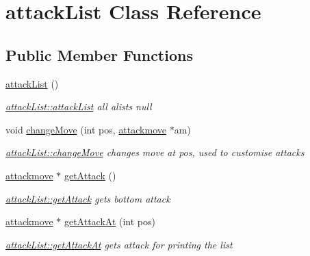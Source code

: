 \hypertarget{classattack_list}{\section{attack\-List Class Reference}
\label{classattack_list}
}
\subsection*{Public Member Functions}
\begin{DoxyCompactItemize}
\item 
\hypertarget{classattack_list_a5edfbea9eb0790b0b2f4bb8a3f39f843}{\hyperlink{classattack_list_a5edfbea9eb0790b0b2f4bb8a3f39f843}{attack\-List} ()}\label{classattack_list_a5edfbea9eb0790b0b2f4bb8a3f39f843}

\begin{DoxyCompactList}\small\item\em \hyperlink{classattack_list_a5edfbea9eb0790b0b2f4bb8a3f39f843}{attack\-List\-::attack\-List} all alists null \end{DoxyCompactList}\item 
void \hyperlink{classattack_list_a8bf01a96841205373a2b179c251f6388}{change\-Move} (int pos, \hyperlink{classattackmove}{attackmove} $\ast$am)
\begin{DoxyCompactList}\small\item\em \hyperlink{classattack_list_a8bf01a96841205373a2b179c251f6388}{attack\-List\-::change\-Move} changes move at pos, used to customise attacks \end{DoxyCompactList}\item 
\hyperlink{classattackmove}{attackmove} $\ast$ \hyperlink{classattack_list_acc9d91fc5f10690b2516c123f13f0342}{get\-Attack} ()
\begin{DoxyCompactList}\small\item\em \hyperlink{classattack_list_acc9d91fc5f10690b2516c123f13f0342}{attack\-List\-::get\-Attack} gets bottom attack \end{DoxyCompactList}\item 
\hyperlink{classattackmove}{attackmove} $\ast$ \hyperlink{classattack_list_a40cb4a49c6403918add3cb4a7043788b}{get\-Attack\-At} (int pos)
\begin{DoxyCompactList}\small\item\em \hyperlink{classattack_list_a40cb4a49c6403918add3cb4a7043788b}{attack\-List\-::get\-Attack\-At} gets attack for printing the list \end{DoxyCompactList}\item 

\end{DoxyCompactItemize}
